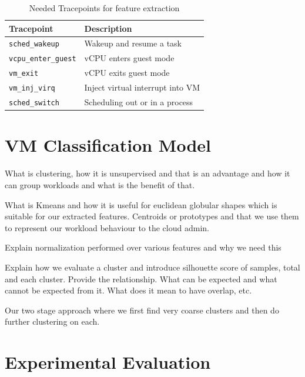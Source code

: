 \documentclass[10pt, conference, compsocconf]{IEEEtran}
\begin{document}
\begin{table}
\caption{Needed Tracepoints for feature extraction}
\centering
\begin{tabular}{p{2.5cm}p{5.8cm}}
  \hline
  \rowcolor{Gray}
  \footnotesize \textbf{Tracepoint} & \footnotesize \textbf{Description} \\
  \hline
  \hline
  
  \footnotesize \texttt{sched\_wakeup}  & \footnotesize Wakeup and resume a task \\
  \footnotesize \texttt{vcpu\_enter\_guest}  & \footnotesize vCPU enters guest mode \\
  \footnotesize \texttt{vm\_exit}  & \footnotesize vCPU exits guest mode \\
  \footnotesize \texttt{vm\_inj\_virq}  & \footnotesize Inject virtual interrupt into VM \\
  \footnotesize \texttt{sched\_switch}  & \footnotesize  Scheduling out or in a process\\
    \hline
\end{tabular}
\label{tab:agent-base-tracepoints}
\end{table}

\section{VM Classification Model}

What is clustering, how it is unsupervised and that is an advantage and how it can group workloads and what is the benefit of that. 

What is Kmeans and how it is useful for euclidean globular shapes which is suitable for our extracted features. Centroids or prototypes and that we use them to represent our workload behaviour to the cloud admin. 

Explain normalization performed over various features and why we need this

Explain how we evaluate a cluster and introduce silhouette score of samples, total and each cluster. Provide the relationship. What can be expected and what cannot be expected from it. What does it mean to have overlap, etc.

Our two stage approach where we first find very coarse clusters and then do further clustering on each.
\section{Experimental Evaluation}
\end{document}
